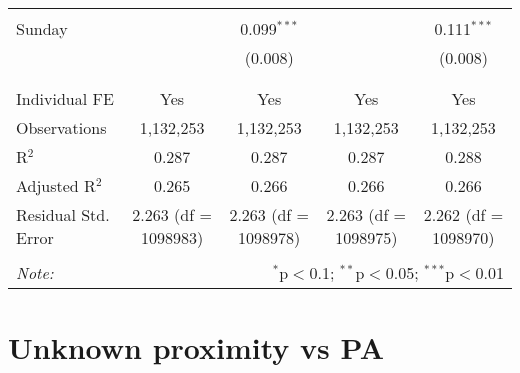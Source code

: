 \documentclass[
]{article}
\begin{document}
\begin{table}[!htbp]
{\begin{tabular}{@{\extracolsep{5pt}}lcccc}
  & & & & \\ 
 Sunday &  & 0.099$^{***}$ &  & 0.111$^{***}$ \\ 
  &  & (0.008) &  & (0.008) \\ 
  & & & & \\ 
\hline \\[-1.8ex] 
Individual FE & Yes & Yes & Yes & Yes \\ 
Observations & 1,132,253 & 1,132,253 & 1,132,253 & 1,132,253 \\ 
R$^{2}$ & 0.287 & 0.287 & 0.287 & 0.288 \\ 
Adjusted R$^{2}$ & 0.265 & 0.266 & 0.266 & 0.266 \\ 
Residual Std. Error & 2.263 (df = 1098983) & 2.263 (df = 1098978) & 2.263 (df = 1098975) & 2.262 (df = 1098970) \\ 
\hline 
\hline \\[-1.8ex] 
\textit{Note:}  & \multicolumn{4}{r}{$^{*}$p$<$0.1; $^{**}$p$<$0.05; $^{***}$p$<$0.01} \\ 
\end{tabular}
} 
\end{table} 
\newpage
\section{Unknown proximity vs PA}
\end{document}
